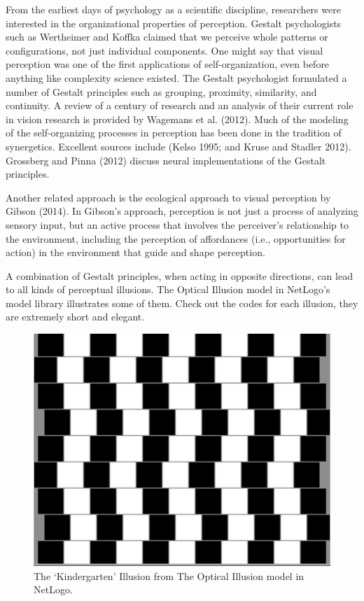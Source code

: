 \documentclass[
  a4paper,
  DIV=11,
  numbers=noendperiod,
  oneside]{scrreprt}
\begin{document}
From the earliest days of psychology as a scientific discipline,
researchers were interested in the organizational properties of
perception. Gestalt psychologists such as Wertheimer and Koffka claimed
that we perceive whole patterns or configurations, not just individual
components. One might say that visual perception was one of the first
applications of self-organization, even before anything like complexity
science existed. The Gestalt psychologist formulated a number of Gestalt
principles such as grouping, proximity, similarity, and continuity. A
review of a century of research and an analysis of their current role in
vision research is provided by Wagemans et al. (2012). Much of the
modeling of the self-organizing processes in perception has been done in
the tradition of synergetics. Excellent sources include (Kelso 1995; and
Kruse and Stadler 2012). Grossberg and Pinna (2012) discuss neural
implementations of the Gestalt principles.

Another related approach is the ecological approach to visual perception
by Gibson (2014). In Gibson's approach, perception is not just a process
of analyzing sensory input, but an active process that involves the
perceiver's relationship to the environment, including the perception of
affordances (i.e., opportunities for action) in the environment that
guide and shape perception.

A combination of Gestalt principles, when acting in opposite directions,
can lead to all kinds of perceptual illusions. The Optical Illusion
model in NetLogo's model library illustrates some of them. Check out the
codes for each illusion, they are extremely short and elegant.

\begin{figure}

{\centering \includegraphics{media/ch5n/image6.jpg}

}

\caption{\label{fig-ch5n-img6-old-44}The `Kindergarten' Illusion from
The Optical Illusion model in NetLogo.}

\end{figure}
\end{document}
